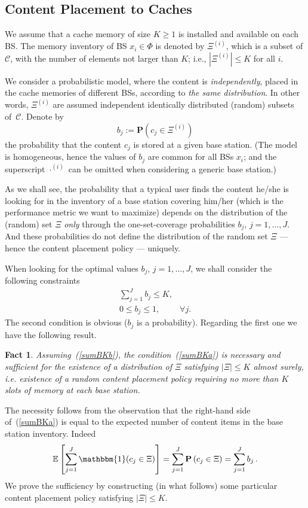 \documentclass[conference,twocolum,final]{IEEEtran}
\newtheorem{Fact}{Fact}
\begin{document}
\subsection{Content Placement to Caches}
We assume that a cache memory of size $K\geq 1$ is installed and available on each BS. The memory inventory of BS $x_i\in\Phi$ is denoted by $\Xi^{(i)}$,  which is a subset of  $\mathcal{C}$, 
with the number of elements not larger than $K$; i.e., $|\Xi^{(i)}|\le K$ for all $i$.


We consider a probabilistic model, where the content is \textit{independently},  placed in the cache memories of different BSs, according to {\em the same distribution}. In other words, $\Xi^{(i)}$ are assumed independent identically distributed (random) subsets of~$\mathcal{C}$.
Denote by 
$$b_j:=\mathbf{P}\left(c_j\in\Xi^{(i)}\right)$$
the probability that the content $c_j$ is stored at a given base station.
(The model is homogeneous, hence the values of $b_j$ are common for all BSs $x_i$;  and the superscript ${\cdot}^{(i)}$ can be omitted when considering a generic base station.) 

As we shall see, the probability that a typical user finds the content he/she is looking for in the inventory of a  base station covering him/her (which is the performance metric we want to maximize) depends on the distribution of the (random) set $\Xi$ {\em only} through the one-set-coverage probabilities $b_j$, $j=1,\ldots,J$. And these probabilities do not define the distribution of the random set 
$\Xi$ --- hence the content placement policy ---  uniquely.

When looking for the optimal values $b_j$, $j=1,\ldots,J$, we shall consider the following constraints
\begin{eqnarray}
\label{sumBKa}
\sum_{j=1}^{J}b_j \leq K, & \\
\label{sumBKb}
0\leq b_j\leq 1, & \forall j.
\end{eqnarray}
The second condition is obvious ($b_j$ is a probability). Regarding the first one we have the following result.
\begin{Fact}
Assuming~(\ref{sumBKb}), the condition~(\ref{sumBKa}) is necessary and sufficient for the existence 
of a distribution of $\Xi$ satisfying   $|\Xi|\le K$ almost surely, i.e. existence of a random content placement policy requiring no  more than $K$ slots of  memory at each base station.
\end{Fact}
\begin{IEEEproof}
The necessity follows from the observation that the right-hand side of~(\ref{sumBKa}) is equal to the 
expected number of content items in the base station inventory. Indeed
$$\mathbb{E}\left[\sum_{j=1}^J \mathbbm{1}(c_j\in\Xi)\right]=\sum_{j=1}^J\mathbf{P}\left(c_j\in\Xi\right)=\sum_{j=1}^{J}b_j\,.$$
We prove  the sufficiency by constructing (in what follows) some particular content placement policy satisfying  $|\Xi|\le K$.
\end{IEEEproof}
\end{document}
